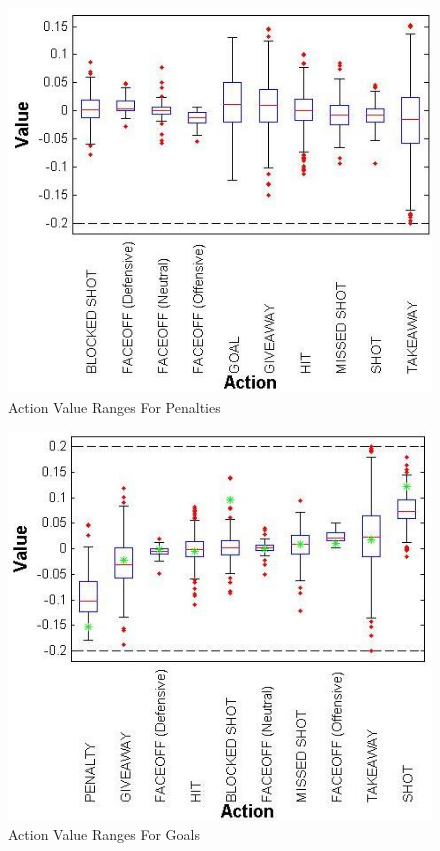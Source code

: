 \documentclass[]{article}
\begin{document}
%
\begin{figure}[ht]
\includegraphics[width = 1.0\columnwidth]{boxplot_penalty_value_full}
\caption{Action Value Ranges For Penalties}
\label{fig:boxplot-action-values-penalties}
\end{figure}

\begin{figure}[ht]
\includegraphics[width = 1.0\columnwidth]{boxplot_actionvalues4}
\caption{Action Value Ranges For Goals}
\label{fig:boxplot-action-values}
\end{figure}
\end{document}
